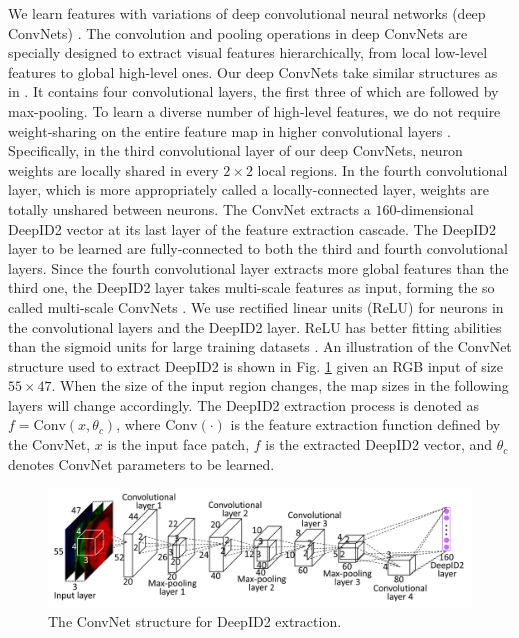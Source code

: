 \documentclass{article} %
\begin{document}
We learn features with variations of deep convolutional neural networks (deep ConvNets) \cite{lecun1998}. The convolution and pooling operations in deep ConvNets are specially designed to extract visual features hierarchically, from local low-level features to global high-level ones. Our deep ConvNets take similar structures as in \cite{sun2014}. It contains four convolutional layers, the first three of which are followed by max-pooling. To learn a diverse number of high-level features, we do not require weight-sharing on the entire feature map in higher convolutional layers \cite{huang2012}. Specifically, in the third convolutional layer of our deep ConvNets, neuron weights are locally shared in every $2 \times 2$ local regions. In the fourth convolutional layer, which is more appropriately called a locally-connected layer, weights are totally unshared between neurons. The ConvNet extracts a $160$-dimensional DeepID2 vector at its last layer of the feature extraction cascade. The DeepID2 layer to be learned are fully-connected to both the third and fourth convolutional layers. Since the fourth convolutional layer extracts more global features than the third one, the DeepID2 layer takes multi-scale features as input, forming the so called multi-scale ConvNets \cite{sermanet2011}. We use rectified linear units (ReLU) \cite{nair2010} for neurons in the convolutional layers and the DeepID2 layer. ReLU has better fitting abilities than the sigmoid units for large training datasets \cite{krizhevsky2012}. An illustration of the ConvNet structure used to extract DeepID2 is shown in Fig. \ref{fig:convnet} given an RGB input of size $55\times47$. When the size of the input region changes, the map sizes in the following layers will change accordingly. The DeepID2 extraction process is denoted as $f=\textrm{Conv}(x,\theta_c)$, where $\textrm{Conv}(\cdot)$ is the feature extraction function defined by the ConvNet, $x$ is the input face patch, $f$ is the extracted DeepID2 vector, and $\theta_c$ denotes ConvNet parameters to be learned.

\begin{figure}[t]
\begin{center}
\includegraphics[width = 0.85\linewidth]{picture/Picture1.png}
\end{center}
\vspace{-0.2in}
\caption{The ConvNet structure for DeepID2 extraction.}
\label{fig:convnet}
\vspace{-0.0in}
\end{figure}
\end{document}
